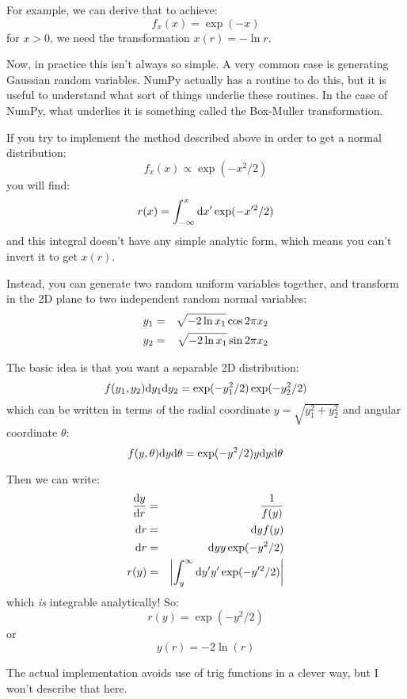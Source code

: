 For example, we can derive that to achieve:
\begin{equation}
f_x(x) = \exp(-x)
\end{equation}
for $x>0$, we need the transformation $x(r) = -\ln r$.

Now, in practice this isn't always so simple. A very common case is
generating Gaussian random variables. NumPy actually has a routine to
do this, but it is useful to understand what sort of things underlie
these routines. In the case of NumPy, what underlies it is something
called the Box-Muller transformation.

If you try to implement the method described above in order to get a
normal distribution:
\begin{equation}
f_x(x) \propto \exp\left(-x^2/2\right)
\end{equation}
you will find:
\begin{equation}
r(x) = \int_{-\infty}^{x} {\rm d}x' \exp(-x'^2/2)
\end{equation}
and this integral doesn't have any simple analytic form, which means
you can't invert it to get $x(r)$. 

Instead, you can generate two random uniform variables together, and
transform in the 2D plane to two independent random normal
variables:
\begin{eqnarray}
y_1 &=& \sqrt{-2 \ln x_1} \cos 2\pi x_2 \cr
y_2 &=& \sqrt{-2 \ln x_1} \sin 2\pi x_2
\end{eqnarray}

The basic idea is that you want a separable 2D distribution:
\begin{equation}
f(y_1, y_2) {\rm d}y_1 {\rm d}y_2 = \exp( - y_1^2/2) \exp(- y_2^2/2)
\end{equation}
which can be written in terms of the radial coordinate $y =
\sqrt{y_1^2 + y_2^2}$ and angular coordinate $\theta$:
\begin{equation}
f(y, \theta) {\rm d}y {\rm d}\theta = 
\exp(-y^2/2) y {\rm d}y {\rm d}\theta
\end{equation}

Then we can write:
\begin{eqnarray}
\frac{{\rm d}y}{{\rm d}r} &=& \frac{1}{f(y)} \cr
{{\rm d}r} &=& {\rm d}y {f(y)} \cr
{{\rm d}r} &=& {\rm d}y y \exp(-y^2/2) \cr
r(y) &=& \left|\int_y^{\infty} {\rm d}y' y' \exp(-y'^2/2)\right|
\end{eqnarray}
which {\it is} integrable analytically! So:
\begin{equation}
r(y) = \exp(- y^2 /2)
\end{equation}
or 
\begin{equation}
y(r) = -2 \ln(r)
\end{equation}

The actual implementation avoids use of trig functions in a clever
way, but I won't describe that here.
